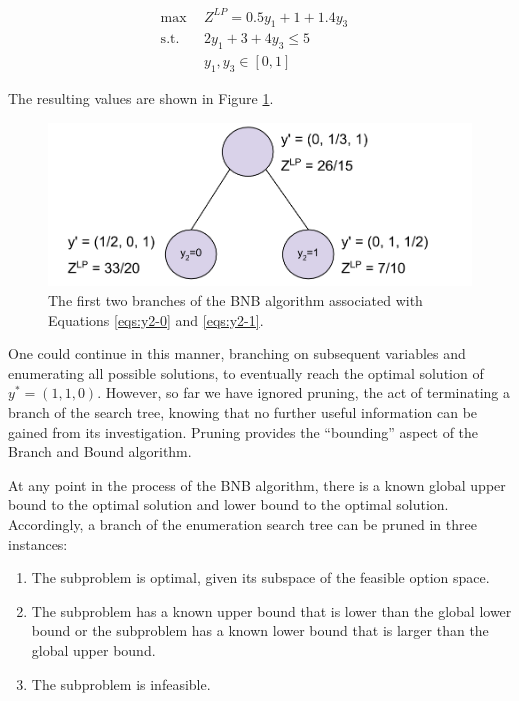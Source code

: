 \begin{subequations}\label{eqs:y2-1}
  \begin{align}
    \max \:\: & 
    Z^{LP} = 0.5 y_1 + 1 + 1.4 y_3
    & \\
    \text{s.t.} \:\: &
    2 y_1 + 3 + 4 y_3 \leq 5 
    & \\
    &
    y_1, y_3 \in [0, 1]
  \end{align}
\end{subequations}

The resulting values are shown in Figure \ref{fig:branch}.

\begin{figure}[H]
  \begin{center}
    \includegraphics[width=\linewidth]{./chapters/litreview/branch.png}
  \caption{The first two branches of the BNB algorithm associated with 
  Equations \ref{eqs:y2-0} and \ref{eqs:y2-1}.}
  \label{fig:branch}
  \end{center}
\end{figure}

One could continue in this manner, branching on subsequent variables and
enumerating all possible solutions, to eventually reach the optimal solution of
$y^* = (1, 1, 0)$. However, so far we have ignored pruning, the act of
terminating a branch of the search tree, knowing that no further useful
information can be gained from its investigation. Pruning provides the
``bounding'' aspect of the Branch and Bound algorithm.

At any point in the process of the BNB algorithm, there is a known global upper
bound to the optimal solution and lower bound to the optimal
solution. Accordingly, a branch of the enumeration search tree can be pruned in
three instances:

\begin{enumerate}
        \item The subproblem is optimal, given its subspace of the feasible
        option space.
        \item The subproblem has a known upper bound that is lower
        than the global lower bound or the subproblem has a known lower bound
        that is larger than the global upper bound.
        \item The subproblem is infeasible.
\end{enumerate}

